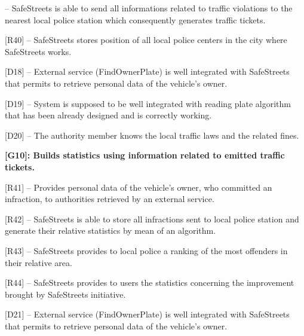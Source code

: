 \documentclass[12pt]{article}
\begin{document}
\begin{flushleft}
[R39] – SafeStreets is able to send all informations related to traffic violations to the nearest local police station which consequently generates traffic tickets.
\vspace{2mm}

[R40] – SafeStreets stores position of all local police centers in the city where SafeStreets works. 
\vspace{2mm}

[D18] -- External service (FindOwnerPlate) is well integrated with SafeStreets that permits to retrieve personal data of the vehicle’s owner.
\vspace{2mm}

[D19] -- System is supposed to be well integrated with reading plate algorithm that has been already designed and is correctly working. 
\vspace{2mm}

[D20] -- The authority member knows the local traffic laws and the related fines.
\vspace{2mm}


\vspace{4mm}
\textbf{ [G10]: Builds statistics using information related to emitted traffic tickets.}
\vspace{2mm}

[R41] -- Provides personal data of the vehicle’s owner, who committed an infraction, to authorities retrieved by an external service.
\vspace{2mm}

[R42] – SafeStreets is able to store all infractions sent to local police station and generate their relative statistics by mean of an algorithm.
\vspace{2mm}

[R43] – SafeStreets provides to local police a ranking of the most offenders in their relative area.
\vspace{2mm}

[R44] –  SafeStreets provides to users the statistics concerning the improvement brought by SafeStreets initiative.
\vspace{2mm}

[D21] -- External service (FindOwnerPlate) is well integrated with SafeStreets that permits to retrieve personal data of the vehicle’s owner.
\vspace{2mm}

\end{flushleft}


\end{document}
